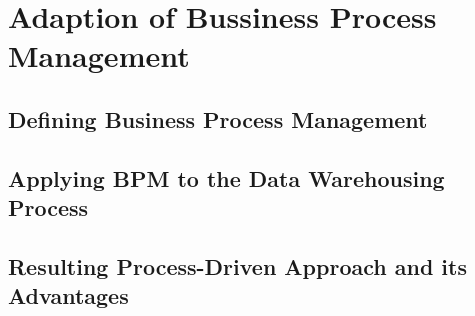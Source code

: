 \section{Adaption of Bussiness Process Management}
\label{sec:bpm}

\subsection{Defining Business Process Management}

\subsection{Applying BPM to the Data Warehousing Process}

\subsection{Resulting Process-Driven Approach and its Advantages}
